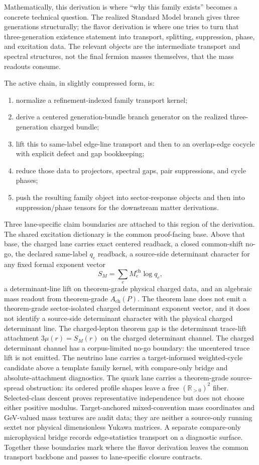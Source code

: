 \documentclass[11pt]{article}
\begin{document}
Mathematically, this derivation is where ``why this family exists'' becomes a concrete technical
question. The realized Standard Model branch gives three generations structurally; the flavor
derivation is where one tries to turn that three-generation existence statement into transport,
splitting, suppression, phase, and excitation data. The relevant objects are the intermediate
transport and spectral structures, not the final fermion masses themselves, that the mass
readouts consume.

The active chain, in slightly compressed form, is:
\begin{enumerate}[leftmargin=2em]
\item normalize a refinement-indexed family transport kernel;
\item derive a centered generation-bundle branch generator on the realized three-generation
charged bundle;
\item lift this to same-label edge-line transport and then to an overlap-edge cocycle with
explicit defect and gap bookkeeping;
\item reduce those data to projectors, spectral gaps, pair suppressions, and cycle phases;
\item push the resulting family object into sector-response objects and then into
suppression/phase tensors for the downstream matter derivations.
\end{enumerate}

Three lane-specific claim boundaries are attached to this region of the derivation. The shared
excitation dictionary is the common proof-facing base. Above that base, the charged lane carries
exact centered readback, a closed common-shift no-go, the declared same-label \(q_e\) readback, a
source-side determinant character for any fixed formal exponent vector
\[
S_M=\sum_e M_e^{\mathrm{ch}}\log q_e,
\]
a determinant-line lift on theorem-grade physical charged data, and an algebraic mass
readout from theorem-grade \(A_{\mathrm{ch}}(P)\). The theorem lane does not emit a theorem-grade
sector-isolated charged determinant exponent vector, and it does not identify a source-side
determinant character with the physical charged determinant line. The charged-lepton theorem gap is the
determinant trace-lift attachment \(3\mu(r)=S_M(r)\) on the charged determinant channel. The charged determinant channel has a corpus-limited no-go boundary: the uncentered trace lift is not emitted. The neutrino lane carries a target-informed weighted-cycle
candidate above a template family kernel, with compare-only bridge and absolute-attachment diagnostics. The quark
lane carries a theorem-grade source-spread obstruction: its ordered profile shapes leave a free
\((\mathbb R_{>0})^2\) fiber. Selected-class descent proves representative independence but does
not choose either positive modulus. Target-anchored mixed-convention mass coordinates and
GeV-valued mass textures are audit data; they are neither a source-only running sextet nor
physical dimensionless Yukawa matrices. A separate compare-only microphysical bridge records
edge-statistics transport on a diagnostic surface. Together these boundaries mark where the flavor
derivation leaves the common transport backbone and passes to lane-specific closure contracts.
\end{document}

